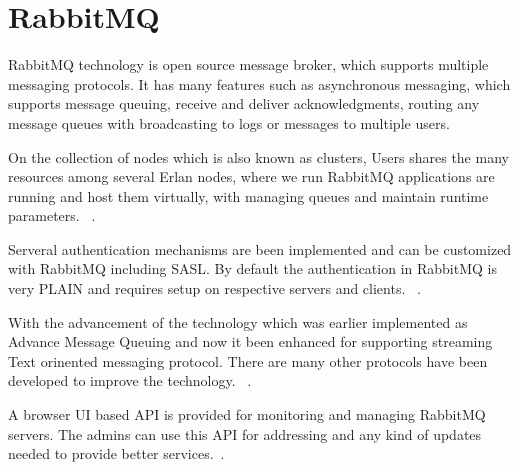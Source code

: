 \section{RabbitMQ}

RabbitMQ technology is open source message broker, which supports multiple
messaging protocols. It has many features such as asynchronous messaging,
which supports message queuing, receive and deliver acknowledgments, routing
any message queues with broadcasting to logs or messages to multiple users.

On the collection of nodes which is also known as clusters, Users shares the 
many resources among several Erlan nodes, where we run RabbitMQ applications 
are running and host them virtually, with managing queues and maintain runtime
parameters. ~\cite{hid-sp18-520-RabbitMQCluster}.

Serveral authentication mechanisms are been implemented and can be customized
with RabbitMQ including SASL. By default the authentication in RabbitMQ is
very PLAIN and requires setup on respective servers and clients.
~\cite{hid-sp18-520-RabbitMQauth}.

With the advancement of the technology which was earlier implemented as
Advance Message Queuing and now it been enhanced for supporting
streaming Text orinented messaging protocol. There are many other protocols
have been developed to improve the technology.
~\cite{hid-sp18-520-RabbitMQwiki}.

A browser UI based API is provided for monitoring and managing RabbitMQ
servers. The admins can use this API for addressing and any kind of updates 
needed to provide better services.~\cite{hid-sp18-520-RabbitMQmana}.
